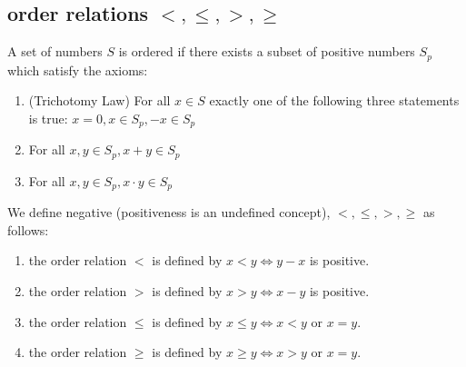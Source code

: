 \documentclass{article}
\begin{document}
    \subsection{order relations $<,\leq,>,\geq$}
    
    A set of numbers $S$ is ordered if there exists a subset of positive numbers $S_p$ which satisfy the axioms:

    \begin{enumerate}
    \item (Trichotomy Law) For all $x \in S$ exactly one of the following three statements is true: $x = 0, x \in S_p, -x \in S_p$
    \item For all $x,y \in S_p, x + y \in S_p$
    \item For all $x,y \in S_p, x \cdot y \in S_p$
    \end{enumerate}

    We define negative (positiveness is an undefined concept), $<,\leq,>,\geq$ as follows:
    
    \begin{enumerate}
    \item the order relation $<$ is defined by $x < y \Leftrightarrow y - x$ is positive.
    \item the order relation $>$ is defined by $x > y \Leftrightarrow x - y$ is positive.
    \item the order relation $\leq$ is defined by $x \leq y \Leftrightarrow x < y$ or $x = y$.
    \item the order relation $\geq$ is defined by $x \geq y \Leftrightarrow x > y$ or $x = y$.
    \end{enumerate}
\end{document}
